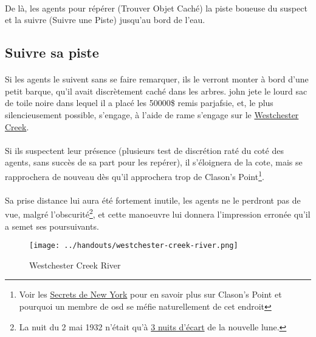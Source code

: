 \paragraph{} De là, les agents pour répérer (Trouver Objet Caché) la piste boueuse du suspect et la suivre (Suivre une Piste) jusqu'au bord de 
l'eau.

\subsection{Suivre sa piste}

\paragraph{} Si les agents le suivent sans se faire remarquer, ils le verront monter à bord d'une petit barque, qu'il avait discrètement caché dans les 
arbres. \gls{john} jete le lourd sac de toile noire dans lequel il a placé les 50000\$ remis par\gls{jafsie}, et, le plus silencieusement possible, 
s'engage, à l'aide de rame s'engage sur le \href{http://en.wikipedia.org/wiki/Westchester\_Creek}{Westchester Creek}.

\paragraph{} Si ils suspectent leur présence (plusieurs test de discrétion raté du coté des agents, sans succès de sa part pour les repérer), il 
s'éloignera de la cote, mais se rapprochera de nouveau dès qu'il approchera trop de Clason's Point\footnote{Voir les 
\href{http://www.tentacules.net/index.php?id=1180}{Secrets de New York} pour en savoir plus sur Clason's Point et pourquoi un membre de \gls{osd}
se méfie naturellement de cet endroit}. 

\paragraph{} Sa prise distance lui aura été fortement inutile, les agents ne le perdront pas de vue, malgré l'obscurité\footnote{La nuit du 2 mai 1932 n'était 
qu'à \href{www.moonconnection.com/moon_phases_calendar.phtml}{3 nuits d'écart} de la nouvelle lune.}, et cette manoeuvre lui donnera l'impression erronée
qu'il a semet ses poursuivants.


\begin{wrapfigure}{r}{60mm}
\begin{center}
 \texttt{[image: ../handouts/westchester-creek-river.png]}
\end{center}
\caption{Westchester Creek River}
\end{wrapfigure}


